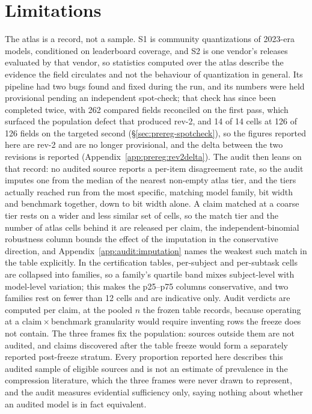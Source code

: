 \section{Limitations}
\label{sec:limitations}

The atlas is a record, not a sample. S1 is community quantizations of 2023-era
models, conditioned on leaderboard coverage, and S2 is one vendor's releases
evaluated by that vendor, so statistics computed over the atlas describe the
evidence the field circulates and not the behaviour of quantization in general.
Its pipeline had two bugs found and fixed during the run, and its numbers were
held provisional pending an independent spot-check; that check has since been
completed twice, with 262 compared fields reconciled on the first pass, which
surfaced the population defect that produced rev-2, and 14 of 14 cells at 126 of
126 fields on the targeted second (\S\ref{sec:prereg-spotcheck}), so the figures
reported here are rev-2 and are no longer provisional, and the delta between the
two revisions is reported (Appendix~\ref{app:prereg:rev2delta}). The audit then
leans on that record: no audited source reports a per-item disagreement rate, so
the audit imputes one from the median of the nearest non-empty atlas tier, and
the tiers actually reached run from the most specific, matching model family,
bit width and benchmark together, down to bit width alone. A claim matched at a
coarse tier rests on a wider and less similar set of cells, so the match tier
and the number of atlas cells behind it are released per claim, the
independent-binomial robustness column bounds the effect of the imputation in
the conservative direction, and Appendix~\ref{app:audit:imputation} names the
weakest such match in the table explicitly. In the certification tables,
per-subject and per-subtask cells are collapsed into families, so a family's
quartile band mixes subject-level with model-level variation; this makes the
p25--p75 columns conservative, and two families rest on fewer than 12 cells and
are indicative only. Audit verdicts are computed per claim, at the pooled $n$
the frozen table records, because operating at a claim\,$\times$\,benchmark
granularity would require inventing rows the freeze does not contain. The three
frames fix the population: sources outside them are not audited, and claims
discovered after the table freeze would form a separately reported post-freeze
stratum. Every proportion reported here describes this audited sample of
\AuditEligible{} eligible sources and is not an estimate of prevalence in the
compression literature, which the three frames were never drawn to represent,
and the audit measures evidential sufficiency only, saying nothing about whether
an audited model is in fact equivalent.

